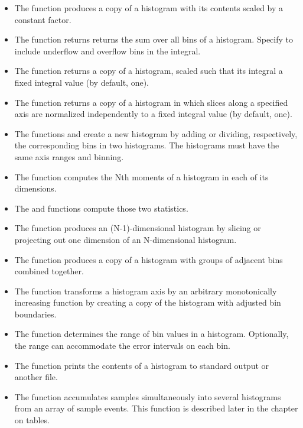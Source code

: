 \begin{itemize}
 \item The function  produces a copy of a histogram with
 its contents scaled by a constant factor.  

 \item The function  returns returns the sum over
 all bins of a histogram.  Specify  to include
 underflow and overflow bins in the integral.  

 \item The function  returns a copy of a histogram,
 scaled such that its integral a fixed integral value (by default, one).

 \item The function  returns a copy of a
 histogram in which slices along a specified axis are normalized
 independently to a fixed integral value (by default, one).

 \item The functions  and  create a new
 histogram by adding or dividing, respectively, the corresponding bins
 in two histograms.  The histograms must have the same axis ranges and
 binning.

 \item The function  computes the Nth moments of a
 histogram in each of its dimensions.

 \item The  and  functions compute
 those two statistics. 

 \item The function  produces an (N-1)-dimensional
 histogram by slicing or projecting out one dimension of an
 N-dimensional histogram.  

 \item The function  produces a copy of a histogram with
 groups of adjacent bins combined together.

 \item The function  transforms a histogram axis by
 an arbitrary monotonically increasing function by creating a copy of
 the histogram with adjusted bin boundaries.

 \item The function  determines the range of bin
 values in a histogram.  Optionally, the range can accommodate the error
 intervals on each bin.

 \item The function  prints the contents of a histogram
 to standard output or another file.

 \item The function  accumulates samples
 simultaneously into several histograms from an array of sample events.
 This function is described later in the chapter on tables.

\end{itemize}

